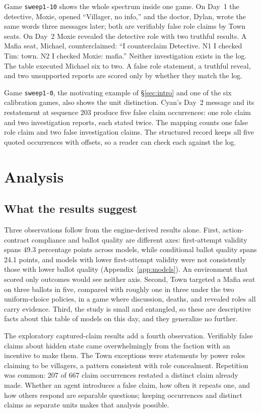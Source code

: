 \documentclass[11pt]{article}
\newcommand{\code}[1]{\texttt{#1}}
\begin{document}
Game \code{sweep1-10} shows the whole spectrum inside one game. On Day~1 the detective, Moxie, opened ``Villager, no info,'' and the doctor, Dylan, wrote the same words three messages later; both are verifiably false role claims by Town seats. On Day~2 Moxie revealed the detective role with two truthful results. A Mafia seat, Michael, counterclaimed: ``I counterclaim Detective. N1 I checked Tim: town. N2 I checked Moxie: mafia.'' Neither investigation exists in the log. The table executed Michael six to two. A false role statement, a truthful reveal, and two unsupported reports are scored only by whether they match the log.

Game \code{sweep1-0}, the motivating example of \S\ref{sec:intro} and one of the six calibration games, also shows the unit distinction. Cyan's Day~2 message and its restatement at sequence 203 produce five false claim occurrences: one role claim and two investigation reports, each stated twice. The mapping counts one false role claim and two false investigation claims. The structured record keeps all five quoted occurrences with offsets, so a reader can check each against the log.

\section{Analysis}
\label{sec:analysis}

\subsection{What the results suggest}

Three observations follow from the engine-derived results alone. First, action-contract compliance and ballot quality are different axes: first-attempt validity spans 49.3 percentage points across models, while conditional ballot quality spans 24.1 points, and models with lower first-attempt validity were not consistently those with lower ballot quality (Appendix~\ref{app:models}). An environment that scored only outcomes would see neither axis. Second, Town targeted a Mafia seat on three ballots in five, compared with roughly one in three under the two uniform-choice policies, in a game where discussion, deaths, and revealed roles all carry evidence. Third, the study is small and entangled, so these are descriptive facts about this table of models on this day, and they generalize no further.

The exploratory captured-claim results add a fourth observation. Verifiably false claims about hidden state came overwhelmingly from the faction with an incentive to make them. The Town exceptions were statements by power roles claiming to be villagers, a pattern consistent with role concealment. Repetition was common: 207 of 667 claim occurrences restated a distinct claim already made. Whether an agent introduces a false claim, how often it repeats one, and how others respond are separable questions; keeping occurrences and distinct claims as separate units makes that analysis possible.
\end{document}
